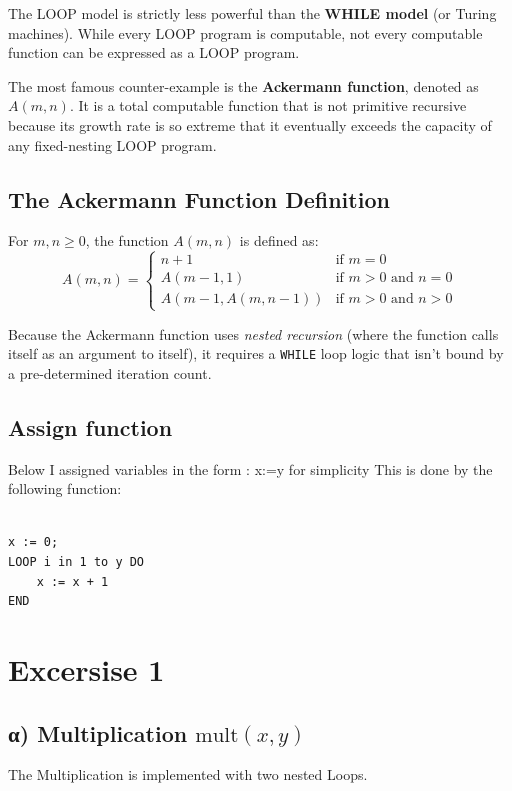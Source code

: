 \documentclass[11pt,a4paper]{article}
\begin{document}
The LOOP model is strictly less powerful than the \textbf{WHILE model} (or Turing machines). While every LOOP program is computable, not every computable function can be expressed as a LOOP program. 

The most famous counter-example is the \textbf{Ackermann function}, denoted as $A(m, n)$. It is a total computable function that is not primitive recursive because its growth rate is so extreme that it eventually exceeds the capacity of any fixed-nesting LOOP program.

\subsection*{The Ackermann Function Definition}
For $m, n \geq 0$, the function $A(m, n)$ is defined as:
\[
A(m, n) = 
\begin{cases} 
n + 1 & \text{if } m = 0 \\
A(m-1, 1) & \text{if } m > 0 \text{ and } n = 0 \\
A(m-1, A(m, n-1)) & \text{if } m > 0 \text{ and } n > 0 
\end{cases}
\]

Because the Ackermann function uses \textit{nested recursion} (where the function calls itself as an argument to itself), it requires a \texttt{WHILE} loop logic that isn't bound by a pre-determined iteration count.

\subsection*{Assign function}
Below I assigned variables in the form : x:=y for simplicity
This is done by the following function:
\begin{lstlisting}

x := 0;
LOOP i in 1 to y DO
    x := x + 1
END

\end{lstlisting}

\pagebreak

\section*{Excersise 1}

\subsection*{α) Multiplication $\text{mult}(x, y)$}
The Multiplication is implemented with two nested Loops.
\end{document}
